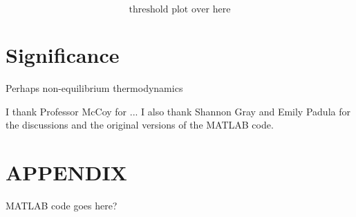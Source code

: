 \documentclass[twocolumn,amsmath,amssymb,aps]{revtex4}
\begin{document}
\begin{equation}
\text{threshold plot over here}
\end{equation}






\section{Significance}

Perhaps non-equilibrium thermodynamics



\begin{acknowledgments}
I thank Professor McCoy for ... I also thank Shannon Gray and Emily Padula for the discussions and the original versions of the MATLAB code.  
\end{acknowledgments}


\appendix

\section{APPENDIX}

MATLAB code goes here?



\end{document}
